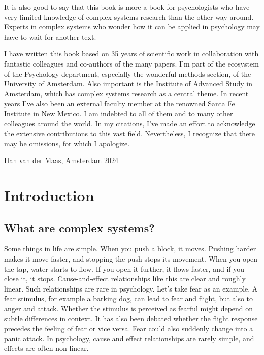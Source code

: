 \documentclass[
  a4paper,
  DIV=11,
  numbers=noendperiod,
  oneside]{scrreprt}
\begin{document}
It is also good to say that this book is more a book for psychologists
who have very limited knowledge of complex systems research than the
other way around. Experts in complex systems who wonder how it can be
applied in psychology may have to wait for another text.

I have written this book based on 35 years of scientific work in
collaboration with fantastic colleagues and co-authors of the many
papers. I'm part of the ecosystem of the Psychology department,
especially the wonderful methods section, of the University of
Amsterdam. Also important is the Institute of Advanced Study in
Amsterdam, which has complex systems research as a central theme. In
recent years I've also been an external faculty member at the renowned
Santa Fe Institute in New Mexico. I am indebted to all of them and to
many other colleagues around the world. In my citations, I've made an
effort to acknowledge the extensive contributions to this vast field.
Nevertheless, I recognize that there may be omissions, for which I
apologize.

Han van der Maas, Amsterdam 2024


\hypertarget{sec-ch1}{%
\chapter{Introduction}\label{sec-ch1}}

\hypertarget{sec-What-are-complex-systems-secWhat}{%
\section{What are complex
systems?}\label{sec-What-are-complex-systems-secWhat}}

Some things in life are simple. When you push a block, it moves. Pushing
harder makes it move faster, and stopping the push stops its movement.
When you open the tap, water starts to flow. If you open it further, it
flows faster, and if you close it, it stops. Cause-and-effect
relationships like this are clear and roughly linear. Such relationships
are rare in psychology. Let's take fear as an example. A fear stimulus,
for example a barking dog, can lead to fear and flight, but also to
anger and attack. Whether the stimulus is perceived as fearful might
depend on subtle differences in context. It has also been debated
whether the flight response precedes the feeling of fear or vice versa.
Fear could also suddenly change into a panic attack. In psychology,
cause and effect relationships are rarely simple, and effects are often
non-linear.
\end{document}
